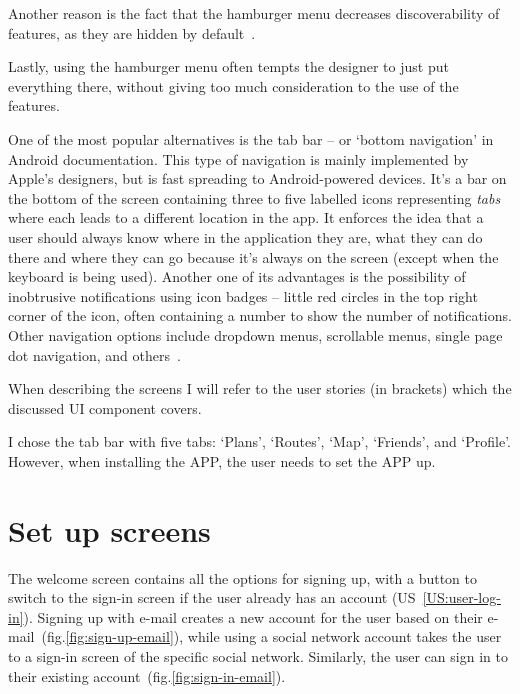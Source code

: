 Another reason is the fact that the hamburger menu decreases discoverability of features, as they are hidden by default~\cite{hamburger-discoverabillity}.

Lastly, using the hamburger menu often tempts the designer to just put everything there, without giving too much consideration to the use of the features.

One of the most popular alternatives is the tab bar -- or `bottom navigation' in Android documentation.
This type of navigation is mainly implemented by Apple's designers, but is fast spreading to Android-powered devices.
It's a bar on the bottom of the screen containing three to five labelled icons representing \textit{tabs} where each leads to a different location in the app.
It enforces the idea that a user should always know where in the application they are, what they can do there and where they can go because it's always on the screen (except when the keyboard is being used).
Another one of its advantages is the possibility of inobtrusive notifications using icon badges -- little red circles in the top right corner of the icon, often containing a number to show the number of notifications.
Other navigation options include dropdown menus, scrollable menus, single page dot navigation, and others~\cite{hamburger-alternatives}.

When describing the screens I will refer to the user stories (in brackets) which the discussed UI component covers.

I chose the tab bar with five tabs: `Plans', `Routes', `Map', `Friends', and `Profile'.
However, when installing the APP, the user needs to set the APP up.

\section{Set up screens}
The welcome screen contains all the options for signing up, with a button to switch to the sign-in screen if the user already has an account (US~\ref{US:user-log-in}).
Signing up with e-mail creates a new account for the user based on their e-mail~(fig.\ref{fig:sign-up-email}), while using a social network account takes the user to a sign-in screen of the specific social network.
Similarly, the user can sign in to their existing account~(fig.\ref{fig:sign-in-email}).

